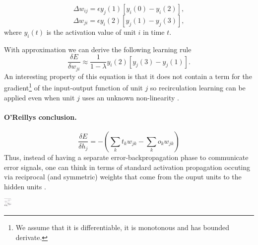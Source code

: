$$\Delta w_{ij} = \epsilon y_j(1)[y_i(0)-y_i(2)],$$
$$\Delta w_{ji} = \epsilon y_i(2)[y_j(1)-y_j(3)],$$
where $y_i(t)$ is the activation value of unit $i$ in time $t$.

With approximation we can derive the following learning rule
$$\frac{\delta E}{\delta w_{ji}} \approx \frac{1}{1-\lambda}y_i(2)[y_j(3)-y_j(1)].$$
An interesting property of this equation is that it does not contain a term for the gradient\footnote{We assume that it is differentiable, it is monotonous and has bounded derivate.} of the input-output function of unit $j$ so recirculation learning can be applied even when unit $j$ uses an unknown non-linearity \cite{hinton1988learning}. 



\paragraph{O'Reillys conclusion.}

$$\frac{\delta E}{\delta h_j} = - (\sum_k t_k w_{jk} - \sum_k o_k w_{jk})$$
Thus, instead of having a separate error-backpropagation phase to communicate error signals, one can think in terms of standard activation propagation occuting via reciprocal (and symmetric) weights that come from the ouput units to the hidden units \cite{o1996bio}. 

\includegraphics[width=15px]{img/recirculation.png}
